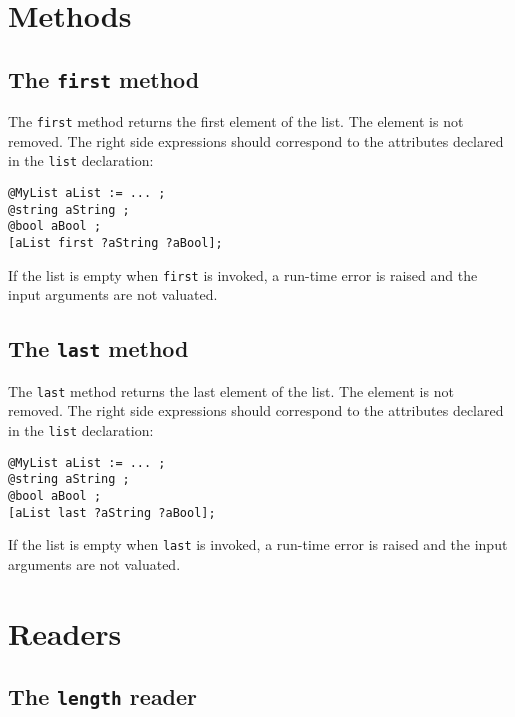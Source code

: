 \section{Methods}

\subsection{The \lstinline[language=galgas]!first! method}

The \lstinline[language=galgas]!first! method returns the first element of the list. The element is not removed. The right side expressions should correspond to the attributes declared in the \lstinline[language=galgas]!list! declaration:

\begin{lstlisting}[language=galgas]
@MyList aList := ... ;
@string aString ;
@bool aBool ;
[aList first ?aString ?aBool];
\end{lstlisting}

If the list is empty when \lstinline[language=galgas]!first! is invoked, a run-time error is raised and the input arguments are not valuated.

\subsection{The \lstinline[language=galgas]!last! method}

The \lstinline[language=galgas]!last! method returns the last element of the list. The element is not removed. The right side expressions should correspond to the attributes declared in the \lstinline[language=galgas]!list! declaration:\\

\begin{lstlisting}[language=galgas]
@MyList aList := ... ;
@string aString ;
@bool aBool ;
[aList last ?aString ?aBool];
\end{lstlisting}


If the list is empty when \lstinline[language=galgas]!last! is invoked, a run-time error is raised and the input arguments are not valuated.








\section{Readers}

\subsection{The \lstinline[language=galgas]!length! reader}

